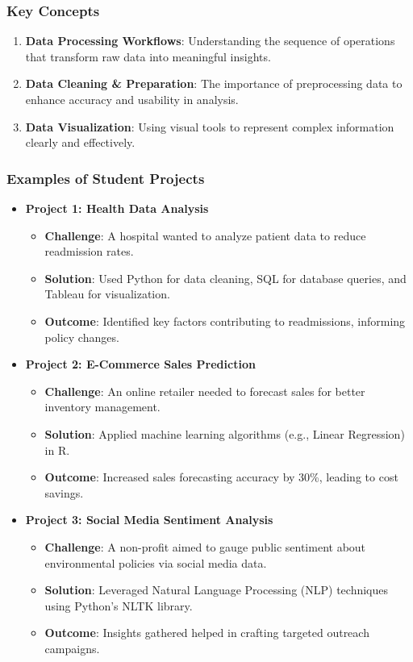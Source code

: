 \documentclass{beamer}
\begin{document}
\begin{frame}
    \frametitle{Key Concepts}
    \begin{enumerate}
        \item \textbf{Data Processing Workflows}: Understanding the sequence of operations that transform raw data into meaningful insights.
        \item \textbf{Data Cleaning \& Preparation}: The importance of preprocessing data to enhance accuracy and usability in analysis.
        \item \textbf{Data Visualization}: Using visual tools to represent complex information clearly and effectively.
    \end{enumerate}
\end{frame}

\begin{frame}[fragile]
    \frametitle{Examples of Student Projects}
    \begin{itemize}
        \item \textbf{Project 1: Health Data Analysis}
            \begin{itemize}
                \item \textbf{Challenge}: A hospital wanted to analyze patient data to reduce readmission rates.
                \item \textbf{Solution}: Used Python for data cleaning, SQL for database queries, and Tableau for visualization.
                \item \textbf{Outcome}: Identified key factors contributing to readmissions, informing policy changes.
            \end{itemize}
            
        \item \textbf{Project 2: E-Commerce Sales Prediction}
            \begin{itemize}
                \item \textbf{Challenge}: An online retailer needed to forecast sales for better inventory management.
                \item \textbf{Solution}: Applied machine learning algorithms (e.g., Linear Regression) in R.
                \item \textbf{Outcome}: Increased sales forecasting accuracy by 30\%, leading to cost savings.
            \end{itemize}
        
        \item \textbf{Project 3: Social Media Sentiment Analysis}
            \begin{itemize}
                \item \textbf{Challenge}: A non-profit aimed to gauge public sentiment about environmental policies via social media data.
                \item \textbf{Solution}: Leveraged Natural Language Processing (NLP) techniques using Python’s NLTK library.
                \item \textbf{Outcome}: Insights gathered helped in crafting targeted outreach campaigns.
            \end{itemize}
    \end{itemize}
\end{frame}
\end{document}
